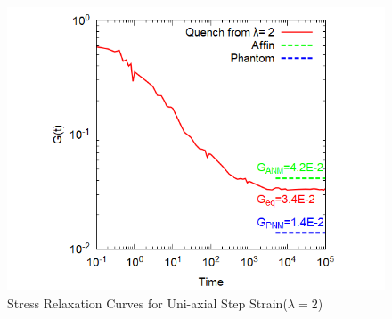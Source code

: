 \documentclass[uplatex,10pt,a4paper,twocolumn]{jsarticle}
\begin{document}
\begin{figure}[htb]
 \centering
	\includegraphics[width=.42\textwidth]{N20_f3_gt.png}
	\caption{Stress Relaxation Curves for Uni-axial Step Strain($\lambda=2$)}
	\label{fig:stress_rel}
\end{figure}
\vspace{-5mm}



\end{document}
